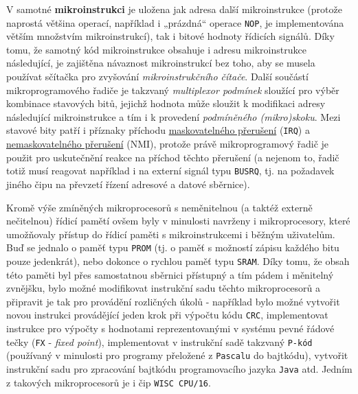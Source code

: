       V samotné \textbf{mikroinstrukci} je uložena jak adresa další mikroinstrukce (protože 
      naprostá většina operací, například i „prázdná“ operace \texttt{NOP}, je implementována 
      větším množstvím mikroinstrukcí), tak i bitové hodnoty řídicích signálů. Díky tomu, že 
      samotný kód mikroinstrukce obsahuje i adresu mikroinstrukce následující, je zajištěna 
      návaznost mikroinstrukcí bez toho, aby se musela používat sčítačka pro zvyšování 
      \emph{mikroinstrukčního čítače}. Další součástí mikroprogramového řadiče je takzvaný 
      \emph{multiplexor podmínek} sloužící pro výběr kombinace stavových bitů, jejichž hodnota může 
      sloužit k modifikaci adresy následující mikroinstrukce a tím i k provedení \emph{podmíněného 
      (mikro)skoku}. Mezi stavové bity patří i příznaky příchodu 
      \hyperlink{ces:IchapIVsecIV}{maskovatelného přerušení} (\texttt{IRQ}) a 
      \hyperlink{ces:IchapIVsecIV}{nemaskovatelného přerušení} (NMI), protože právě mikroprogramový 
      řadič je použit pro uskutečnění reakce na příchod těchto přerušení (a nejenom to, řadič totiž 
      musí reagovat například i na externí signál typu \texttt{BUSRQ}, tj. na požadavek jiného čipu 
      na převzetí řízení adresové a datové sběrnice). 
      
      \begin{tcnote}
        Kromě výše zmíněných mikroprocesorů s neměnitelnou (a taktéž externě nečitelnou) řídicí 
        pamětí ovšem byly v minulosti navrženy i mikroprocesory, které umožňovaly přístup do řídicí 
        paměti s mikroinstrukcemi i běžným uživatelům. Buď se jednalo o paměť typu \texttt{PROM} 
        (tj. o paměť s možností zápisu každého bitu pouze jedenkrát), nebo dokonce o rychlou paměť 
        typu \texttt{SRAM}. Díky tomu, že obsah této paměti byl přes samostatnou sběrnici přístupný 
        a tím pádem i měnitelný zvnějšku, bylo možné modifikovat instrukční sadu těchto 
        mikroprocesorů a připravit je tak pro provádění rozličných úkolů - například bylo možné 
        vytvořit novou instrukci provádějící jeden krok při výpočtu kódu \texttt{CRC}, 
        implementovat instrukce pro výpočty s hodnotami reprezentovanými v systému pevné řádové 
        tečky (\texttt{FX} - \emph{fixed point}), implementovat v instrukční sadě takzvaný 
        \texttt{P-kód} (používaný v minulosti pro programy přeložené z \texttt{Pascalu} do 
        bajtkódu), vytvořit instrukční sadu pro zpracování bajtkódu programovacího jazyka 
        \texttt{Java} atd. Jedním z takových mikroprocesorů je i čip \texttt{WISC CPU/16}.
      \end{tcnote}
           
